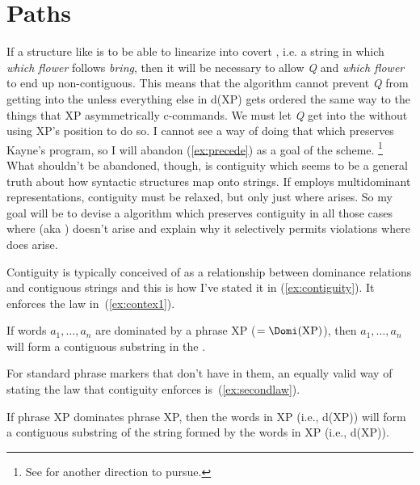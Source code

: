 \documentclass[output=paper]{langsci/langscibook}
\begin{document}

\section{Paths} %
\label{sec:paths}

If a structure like  is to be able to linearize into covert , i.e. a string in which \emph{which flower} follows \emph{bring}, then it will be necessary to allow \emph{Q} and \emph{which flower} to end up non-contiguous. This means that the  algorithm cannot prevent \emph{Q} from getting into the  unless everything else in d(XP) gets ordered the same way to the things that XP asymmetrically c-commands. We must let \emph{Q} get into the  without using XP's position to do so. I cannot see a way of doing that which preserves Kayne's program, so I will abandon (\ref{ex:precede}) as a goal of the  scheme.%
\footnote{See \cite{AbeNee2012} for another direction to pursue.} %
What shouldn't be abandoned, though, is contiguity which seems to be a general truth about how syntactic structures map onto strings. If  employs multidominant representations, contiguity must be relaxed, but only just where  arises. So my goal will be to devise a  algorithm which preserves contiguity in all those cases where  (aka ) doesn't arise and explain why it selectively permits violations where  does arise.

Contiguity is typically conceived of as a relationship between dominance relations and contiguous strings and this is how I've stated it in (\ref{ex:contiguity}). It enforces the law in~(\ref{ex:contex1}).

\begin{exe}
	\ex \label{ex:contex1}
	If words $a_1,\ldots,a_n$ are dominated by a phrase XP ($=\Domi(\text{XP})$), then $a_1,\ldots,a_n$ will form a contiguous substring in the .
\end{exe}

For standard phrase markers that don't have  in them, an equally valid way of stating the law that contiguity enforces is~(\ref{ex:secondlaw}).
\begin{exe}
	\ex \label{ex:secondlaw}
	If phrase XP dominates phrase XP, then the words in XP (i.e., d(XP)) will form a contiguous substring of the string formed by the words in XP (i.e., d(XP)).
\end{exe}
\end{document}
